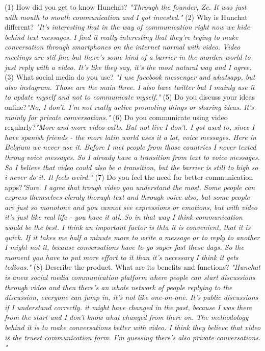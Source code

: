 \documentclass[12pt]{article}
\begin{document}
(1) How did you get to know Hunchat?  \textit{"Through the founder, Ze. It was just with mouth to mouth communication and I got invested."}
(2) Why is Hunchat different? \textit{"It's interesting that in the way of communication right now we hide behind text messages. I find it really interesting that they're trying to make conversation through smartphones on the internet normal with video. Video meetings are stil fine but there's some kind of a barrier in the morden world to just reply with a video. It's like they say, it's the most natural way and I agree.}
(3) What social media do you use? \textit{"I use facebook messenger and whatsapp, but also instagram. Those are the main three. I also have twitter but I mainly use it to update myself and not to communicate myself."}
(5) Do you discuss your ideas online?\textit{"No, I don't. I'm not really active promoting things or sharing ideas. It's mainly for private conversations."}
(6) Do you communicate using video regularly?\textit{"More and more video calls. But not live I don't. I got used to, since I have spanish friends - the more latin world uses it a lot, voice messages. Here in Belgium we never use it. Before I met people from those countries I never texted throug voice messages. So I already have a transition from text to voice messages. So I believe that video could also be a transition, but the barrier is still to high so i never do it. It feels weird."}
(7) Do you feel the need for better communication apps?\textit{"Sure. I agree that trough video you understand the most. Some people can express themselves cleraly thorugh text and through voice also, but some people are just so monotone and you cannot see expressions or emotions, but with video it's just like real life - you have it all. So in that way I think communication would be the best. I think an important factor is thta it is convenient, that it is quick. If it takes me half a minute more to write a message or to reply to another I might not it, because conversations have to go super fast these days. So the moment you have to put more effort to it than it's necessary I think it gets tedious."}
(8) Describe the product. What are its benefits and functions? \textit{"Hunchat is anew social media communication platform where people can start discussions through video and then there's an whole network of people replying to the discussion, everyone can jump in, it's not like one-on-one. It's public discussions if I understand correctly. it might have changed in the past, because I was there from the start and I don't know what changed from there on. The methodology behind it is to make conversations better with video. I think they believe that video is the truest communication form. I'm guessing there's also private conversations. "}
\end{document}
